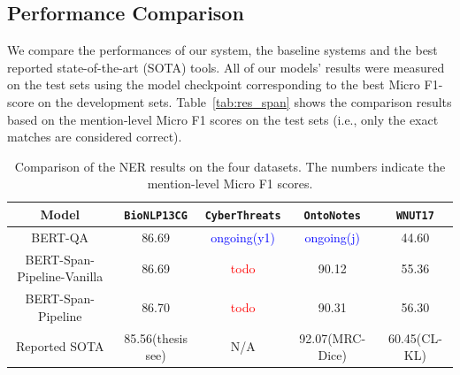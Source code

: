 \subsection{Performance Comparison}
We compare the performances of our system, the baseline systems and the best reported 
state-of-the-art (SOTA) tools. 
All of our models' results were measured on the test sets using the model checkpoint corresponding to the best Micro F1-score on the development sets. 
Table~\ref{tab:res_span} shows the comparison results based on the mention-level Micro F1 scores on the test sets (i.e., only the exact matches are considered correct).
\begin{table}[h!]
\centering
\begin{small}
\begin{tabular}{ccccc}\toprule
 \textbf{Model} & \texttt{BioNLP13CG} & \texttt{CyberThreats} & \texttt{OntoNotes} & \texttt{WNUT17} \\ \toprule 
BERT-QA & 86.69 & \textcolor{blue}{ongoing(y1)} & \textcolor{blue}{ongoing(j)}  & 44.60 \\
BERT-Span-Pipeline-Vanilla     & 86.69 & \textcolor{red}{todo} & 90.12 & 55.36  \\
BERT-Span-Pipeline     & 86.70 & \textcolor{red}{todo} & 90.31 & 56.30  \\
Reported SOTA & 85.56(thesis see) & N/A & 92.07(MRC-Dice) & 60.45(CL-KL)  \\
\bottomrule
\end{tabular}
\caption{Comparison of the NER results on the four datasets. The numbers indicate the mention-level Micro F1 scores. 
}
\label{tab:main}
\end{small}
\end{table}

